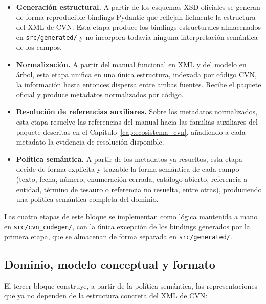 \begin{itemize}
  \item \textbf{Generación estructural.} A partir de los esquemas XSD
  oficiales se generan de forma reproducible bindings Pydantic que reflejan
  fielmente la estructura del XML de CVN. Esta etapa produce los bindings
  estructurales almacenados en \texttt{src/generated/} y no incorpora todavía
  ninguna interpretación semántica de los campos.

  \item \textbf{Normalización.} A partir del manual funcional en XML y del
  modelo en árbol, esta etapa unifica en una única estructura, indexada por
  código CVN, la información hasta entonces dispersa entre ambas fuentes.
  Recibe el paquete oficial y produce metadatos normalizados por código.

  \item \textbf{Resolución de referencias auxiliares.} Sobre los metadatos
  normalizados, esta etapa resuelve las referencias del manual hacia las
  familias auxiliares del paquete descritas en el
  Capítulo~\ref{cap:ecosistema_cvn}, añadiendo a cada metadato la evidencia de
  resolución disponible.

  \item \textbf{Política semántica.} A partir de los metadatos ya resueltos,
  esta etapa decide de forma explícita y trazable la forma semántica de cada
  campo (texto, fecha, número, enumeración cerrada, catálogo abierto,
  referencia a entidad, término de tesauro o referencia no resuelta, entre
  otras), produciendo una política semántica completa del dominio.
\end{itemize}

Las cuatro etapas de este bloque se implementan como lógica mantenida a mano
en \texttt{src/cvn\_codegen/}, con la única excepción de los bindings
generados por la primera etapa, que se almacenan de forma separada en
\texttt{src/generated/}.

\subsection{Dominio, modelo conceptual y formato}
\label{sec:metodologia_arquitectura_dominio}

El tercer bloque construye, a partir de la política semántica, las
representaciones que ya no dependen de la estructura concreta del XML de CVN:

